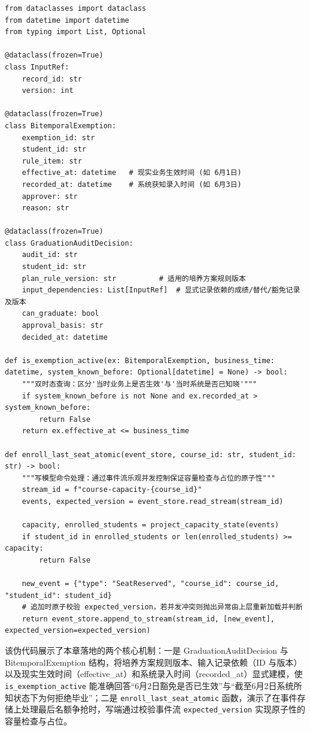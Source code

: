 \documentclass[UTF8,a4paper,11pt,fontset=fandol]{ctexart}
\begin{document}
\begin{lstlisting}[basicstyle={\ttfamily\small\linespread{1}\selectfont},captionpos=t,caption={带输入依赖、规则版本与双时态时间戳的毕业审核及乐观并发选课伪代码}]
from dataclasses import dataclass
from datetime import datetime
from typing import List, Optional

@dataclass(frozen=True)
class InputRef:
    record_id: str
    version: int

@dataclass(frozen=True)
class BitemporalExemption:
    exemption_id: str
    student_id: str
    rule_item: str
    effective_at: datetime   # 现实业务生效时间 (如 6月1日)
    recorded_at: datetime    # 系统获知录入时间 (如 6月3日)
    approver: str
    reason: str

@dataclass(frozen=True)
class GraduationAuditDecision:
    audit_id: str
    student_id: str
    plan_rule_version: str          # 适用的培养方案规则版本
    input_dependencies: List[InputRef]  # 显式记录依赖的成绩/替代/豁免记录及版本
    can_graduate: bool
    approval_basis: str
    decided_at: datetime

def is_exemption_active(ex: BitemporalExemption, business_time: datetime, system_known_before: Optional[datetime] = None) -> bool:
    """双时态查询：区分'当时业务上是否生效'与'当时系统是否已知晓'"""
    if system_known_before is not None and ex.recorded_at > system_known_before:
        return False
    return ex.effective_at <= business_time

def enroll_last_seat_atomic(event_store, course_id: str, student_id: str) -> bool:
    """写模型命令处理：通过事件流乐观并发控制保证容量检查与占位的原子性"""
    stream_id = f"course-capacity-{course_id}"
    events, expected_version = event_store.read_stream(stream_id)

    capacity, enrolled_students = project_capacity_state(events)
    if student_id in enrolled_students or len(enrolled_students) >= capacity:
        return False

    new_event = {"type": "SeatReserved", "course_id": course_id, "student_id": student_id}
    # 追加时原子校验 expected_version，若并发冲突则抛出异常由上层重新加载并判断
    return event_store.append_to_stream(stream_id, [new_event], expected_version=expected_version)
\end{lstlisting}

该伪代码展示了本章落地的两个核心机制：一是 GraduationAuditDecision 与 BitemporalExemption 结构，将培养方案规则版本、输入记录依赖（ID 与版本）以及现实生效时间（effective\_at）和系统录入时间（recorded\_at）显式建模，使 \texttt{is\_exemption\_active} 能准确回答“6月2日豁免是否已生效”与“截至6月2日系统所知状态下为何拒绝毕业”；二是 \texttt{enroll\_last\_seat\_atomic} 函数，演示了在事件存储上处理最后名额争抢时，写端通过校验事件流 \texttt{expected\_version} 实现原子性的容量检查与占位。
\end{document}
